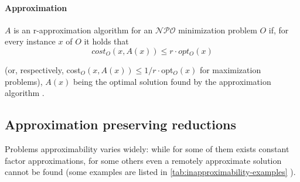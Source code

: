 \paragraph{Approximation}%
\label{par:r_approximations}

$A$ is an r-approximation algorithm for an $\mathcal{NPO} $ minimization
problem $O$ if, for every instance $x$ of $O$ it holds that
\begin{equation*}
	cost_{O} (x, A(x)) \leq r \cdot opt_{O} (x)
\end{equation*}

\noindent
(or, respectively, cost$_{O} (x, A(x))
	\leq 1/r \cdot $opt$_{O} (x) $ for maximization problems), $A(x)$ being the
optimal solution found by the approximation algorithm \cite{Trevisan2004}.

\subsection{Approximation preserving reductions}%
\label{sub:approximation_preserving_reductions}

Problems approximability varies widely: while for some of them exists
constant factor approximations, for some others even a remotely approximate
solution cannot be found \cite{Ausiello2005} (some examples are listed in
\autoref{tab:inapproximability-examples} ).

